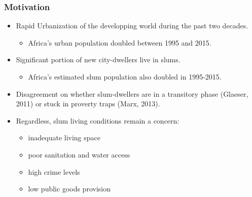 \documentclass[aspectratio=149]{beamer}
\begin{document}
\begin{frame}
\frametitle{Motivation}

\begin{itemize}
\item Rapid Urbanization of the developping world during the past two decades. 
\vspace{1mm}
\begin{itemize}
\item Africa's urban population doubled between 1995 and 2015.
\end{itemize}
\vspace{1mm}
\item Significant portion of new city-dwellers live in slums.
\vspace{1mm}
\begin{itemize}
\item Africa's estimated slum population also doubled in 1995-2015.
\end{itemize}
\vspace{1mm}
\item Disagreement on whether slum-dwellers are in a transitory phase (Glaeser, 2011) or stuck in proverty traps (Marx, 2013). 
\vspace{1mm}
\item Regardless, slum living conditions remain a concern:
\vspace{1mm}
\begin{itemize}
\item inadequate living space
\item poor sanitation and water access
\item high crime levels
\item low public goods provision



\end{itemize}
\vspace{1mm}
\end{itemize}

\end{frame}

\end{document}
